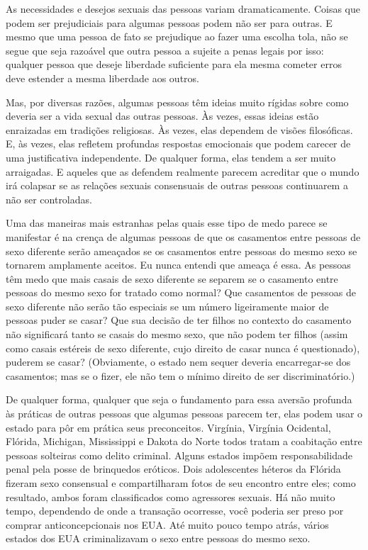 As necessidades e desejos sexuais das pessoas variam dramaticamente. Coisas que podem ser prejudiciais para algumas pessoas podem não ser para outras. E mesmo que uma pessoa de fato se prejudique ao fazer uma escolha tola, não se segue que seja razoável que outra pessoa a sujeite a penas legais por isso: qualquer pessoa que deseje liberdade suficiente para ela mesma cometer erros deve estender a mesma liberdade aos outros.

Mas, por diversas razões, algumas pessoas têm ideias muito rígidas sobre como deveria ser a vida sexual das outras pessoas. Às vezes, essas ideias estão enraizadas em tradições religiosas. Às vezes, elas dependem de visões filosóficas. E, às vezes, elas refletem profundas respostas emocionais que podem carecer de uma justificativa independente. De qualquer forma, elas tendem a ser muito arraigadas. E aqueles que as defendem realmente parecem acreditar que o mundo irá colapsar se as relações sexuais consensuais de outras pessoas continuarem a não ser controladas.

Uma das maneiras mais estranhas pelas quais esse tipo de medo parece se manifestar é na crença de algumas pessoas de que os casamentos entre pessoas de sexo diferente serão ameaçados se os casamentos entre pessoas do mesmo sexo se tornarem amplamente aceitos. Eu nunca entendi que ameaça é essa. As pessoas têm medo que mais casais de sexo diferente se separem se o casamento entre pessoas do mesmo sexo for tratado como normal? Que casamentos de pessoas de sexo diferente não serão tão especiais se um número ligeiramente maior de pessoas puder se casar? Que sua decisão de ter filhos no contexto do casamento não significará tanto se casais do mesmo sexo, que não podem ter filhos (assim como casais estéreis de sexo diferente, cujo direito de casar nunca é questionado), puderem se casar? (Obviamente, o estado nem sequer deveria encarregar-se dos casamentos; mas se o fizer, ele não tem o mínimo direito de ser discriminatório.)

De qualquer forma, qualquer que seja o fundamento para essa aversão profunda às práticas de outras pessoas que algumas pessoas parecem ter, elas podem usar o estado para pôr em prática seus preconceitos. Virgínia, Virgínia Ocidental, Flórida, Michigan, Mississippi e Dakota do Norte todos tratam a coabitação entre pessoas solteiras como delito criminal. Alguns estados impõem responsabilidade penal pela posse de brinquedos eróticos. Dois adolescentes héteros da Flórida fizeram sexo consensual e compartilharam fotos de seu encontro entre eles; como resultado, ambos foram classificados como agressores sexuais. Há não muito tempo, dependendo de onde a transação ocorresse, você poderia ser preso por comprar anticoncepcionais nos EUA. Até muito pouco tempo atrás, vários estados dos EUA criminalizavam o sexo entre pessoas do mesmo sexo.


